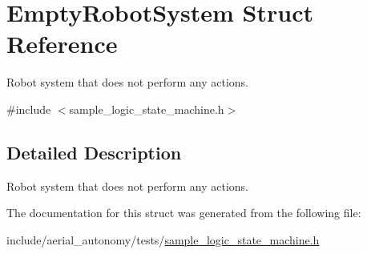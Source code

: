 \hypertarget{structEmptyRobotSystem}{\section{Empty\-Robot\-System Struct Reference}
\label{structEmptyRobotSystem}
}


Robot system that does not perform any actions.  




{\ttfamily \#include $<$sample\-\_\-logic\-\_\-state\-\_\-machine.\-h$>$}



\subsection{Detailed Description}
Robot system that does not perform any actions. 

The documentation for this struct was generated from the following file\-:\begin{DoxyCompactItemize}
\item 
include/aerial\-\_\-autonomy/tests/\hyperlink{sample__logic__state__machine_8h}{sample\-\_\-logic\-\_\-state\-\_\-machine.\-h}\end{DoxyCompactItemize}
